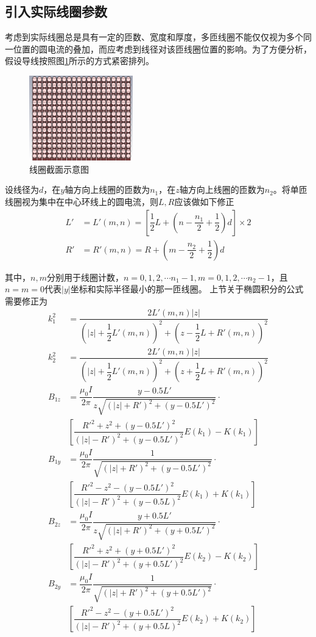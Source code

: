 \documentclass{ctexart}
\begin{document}
\begin{multicols}{2}
\subsection{引入实际线圈参数}
考虑到实际线圈总是具有一定的匝数、宽度和厚度，多匝线圈不能仅仅视为多个同一位置的圆电流的叠加，而应考虑到线径对该匝线圈位置的影响。为了方便分析，假设导线按照图\ref{截面}所示的方式紧密排列。
\begin{figure}[H]
    \centering
    \includegraphics[width=0.4\textwidth]{./pic/线圈截面.png}
    \caption{线圈截面示意图}
    \label{截面}
\end{figure}
设线径为$d$，在$y$轴方向上线圈的匝数为$n_1$，在$z$轴方向上线圈的匝数为$n_2$。将单匝线圈视为集中在中心环线上的圆电流，则$L,R$应该做如下修正
\begin{align}
    L'&=L'(m,n)=[\dfrac{1}{2}L+(n-\dfrac{n_1}{2}+\dfrac{1}{2})d]\times 2\\
    R'&=R'(m,n)=R+(m-\dfrac{n_2}{2}+\dfrac{1}{2})d
\end{align}

其中，$n,m$分别用于线圈计数，$n=0,1,2,\cdots n_1-1,m=0,1,2,\cdots n_2-1$，且$n=m=0$代表$|y|$坐标和实际半径最小的那一匝线圈。
上节关于椭圆积分的公式需要修正为
\begin{align}
    k_1^2&=\dfrac{2L'(m,n)|z|}{(|z|+\dfrac{1}{2}L'(m,n))^2+(z-\dfrac{1}{2}L+R'(m,n))^2}\\
    k_2^2&=\dfrac{2L'(m,n)|z|}{(|z|+\dfrac{1}{2}L'(m,n))^2+(z+\dfrac{1}{2}L+R'(m,n))^2}\\
    B_{1z}&=\dfrac{\mu_0 I}{2\pi}\dfrac{y-0.5L'}{z\sqrt{(|z|+R')^2+(y-0.5L')^2}} \cdot \\
    &[\dfrac{R'^2+z^2+(y-0.5L')^2}{(|z|-R')^2+(y-0.5L')^2}E(k_1)-K(k_1)]\\
    B_{1y}&=\dfrac{\mu_0 I}{2\pi}\dfrac{1}{\sqrt{(|z|+R')^2+(y-0.5L')^2}}\cdot \\
    &[\dfrac{R'^2-z^2-(y-0.5L')^2}{(|z|-R')^2+(y-0.5L)^2}E(k_1)+K(k_1)]\\
    B_{2z}&=\dfrac{\mu_0 I}{2\pi}\dfrac{y+0.5L'}{z\sqrt{(|z|+R')^2+(y+0.5L')^2}} \cdot \\
    &[\dfrac{R'^2+z^2+(y+0.5L')^2}{(|z|-R')^2+(y+0.5L')^2}E(k_2)-K(k_2)]\\
    B_{2y}&=\dfrac{\mu_0 I}{2\pi}\dfrac{1}{\sqrt{(|z|+R')^2+(y+0.5L')^2}}\cdot \\
    &[\dfrac{R'^2-z^2-(y+0.5L')^2}{(|z|-R')^2+(y+0.5L)^2}E(k_2)+K(k_2)]
\end{align}

\end{multicols}
\end{document}
